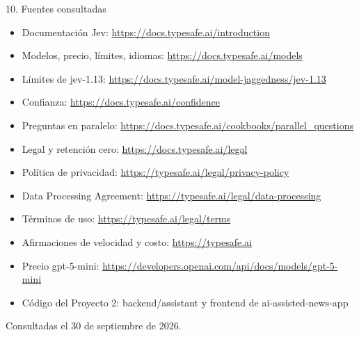 \documentclass{article}
\begin{document}
\begin{minipage}[t]{0.38\linewidth}\vspace{0pt}
\begin{panel}[equal height group=f4]{10. Fuentes consultadas}
  \fontsize{12.5}{16}\selectfont
  \begin{itemize}
    \item Documentación Jev: \url{https://docs.typesafe.ai/introduction}
    \item Modelos, precio, límites, idiomas: \url{https://docs.typesafe.ai/models}
    \item Límites de jev-1.13: \url{https://docs.typesafe.ai/model-jaggedness/jev-1.13}
    \item Confianza: \url{https://docs.typesafe.ai/confidence}
    \item Preguntas en paralelo: \url{https://docs.typesafe.ai/cookbooks/parallel_questions}
    \item Legal y retención cero: \url{https://docs.typesafe.ai/legal}
    \item Política de privacidad: \url{https://typesafe.ai/legal/privacy-policy}
    \item Data Processing Agreement: \url{https://typesafe.ai/legal/data-processing}
    \item Términos de uso: \url{https://typesafe.ai/legal/terms}
    \item Afirmaciones de velocidad y costo: \url{https://typesafe.ai}
    \item Precio gpt-5-mini: \url{https://developers.openai.com/api/docs/models/gpt-5-mini}
    \item Código del Proyecto 2: backend/assistant y frontend de ai-assisted-news-app
  \end{itemize}
  Consultadas el 30 de septiembre de 2026.
\end{panel}
\end{minipage}
\end{document}

